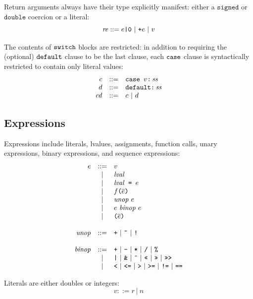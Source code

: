 \documentclass{article}
\newcommand{\funcall}[2]{{#1}\mathjs{(}{#2}\mathjs{)}}
\newcommand{\paren}[1]{\mathjs{(}{#1}\mathjs{)}}
\newcommand{\seq}[1]{\overline{{#1}}}
\newcommand{\mathjs}[1]{\mbox{\texttt{{#1}}}}
\newcommand{\signed}{\mathtt{signed}}
\newcommand{\double}{\mathtt{double}}
\newcommand{\todouble}[1]{\mathjs{+}{#1}}
\begin{document}
Return arguments always have their type explicitly manifest: either a
$\signed$ or $\double$ coercion or a literal:
\[
\mathit{re} ::= e\mathjs{|0} ~|~ \todouble{e} ~|~ v
\]

The contents of $\mathjs{switch}$ blocks are restricted: in addition
to requiring the (optional) $\mathjs{default}$ clause to be the last
clause, each $\mathjs{case}$ clause is syntactically restricted to
contain only literal values:
\[
\begin{array}{rcl}
c & ::= & \mathjs{case }v\mathjs{:}\,\mathit{ss} \\
d & ::= & \mathjs{default:}\,\mathit{ss} \\
\mathit{cd} & ::= & c ~|~ d \\
\end{array}
\]

\subsection{Expressions}

Expressions include literals, lvalues, assignments, function calls,
unary expressions, binary expressions, and sequence expressions:
\[
\begin{array}{rcl}
e & ::= & v \\
  &  |  & \mathit{lval} \\
  &  |  & \mathit{lval}\mathjs{ = }e \\
  &  |  & \funcall{f}{\seq{e}} \\
  &  |  & \mathit{unop}\ e \\
  &  |  & e\ \mathit{binop}\ e \\
  &  |  & \paren{\seq{e}} \\
\\
\mathit{unop} & ::= & \mathjs{+} ~|~ \mathjs{\~{}} ~|~ \mathjs{!} \\
\\
\mathit{binop} & ::= & \mathjs{+} ~|~ \mathjs{-} ~|~ \mathjs{*} ~|~ \mathjs{/} ~|~ \mathjs{\%} \\
               &  |  & \mathjs{|} ~|~ \mathjs{\&} ~|~ \mathjs{\^{}} ~|~ \mathjs{<<} ~|~ \mathjs{>>} ~|~ \mathjs{>>>} \\
               &  |  & \mathjs{<} ~|~ \mathjs{<=} ~|~ \mathjs{>} ~|~ \mathjs{>=} ~|~ \mathjs{!=} ~|~ \mathjs{==} \\
\end{array}
\]

Literals are either doubles or integers:
\[
v ::= r ~|~ n
\]
\end{document}
